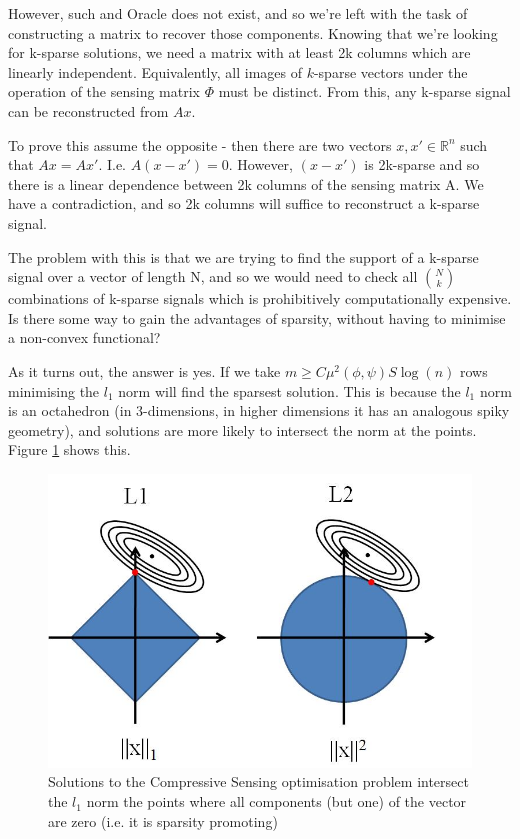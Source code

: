 However, such and Oracle does not exist, and so we're left with the task of constructing a matrix to recover those components. Knowing that we're looking for k-sparse solutions, we need a matrix with at least 2k columns which are linearly independent. Equivalently, all images of \(k\)-sparse vectors under the operation of the sensing matrix \(\Phi\) must be distinct. From this, any k-sparse signal can be reconstructed from \(Ax\). 

To prove this assume the opposite - then there are two vectors \(x, x' \in \mathbb{R}^n\) such that \(Ax = Ax'\). I.e. \(A(x-x') = 0\). However, \((x-x')\) is 2k-sparse and so there is a linear dependence between 2k columns of the sensing matrix A. We have a contradiction, and so 2k columns will suffice to reconstruct a k-sparse signal. 

The problem with this is that we are trying to find the support of a k-sparse signal over a vector of length N, and so we would need to check all \(N \choose k\) combinations of k-sparse signals which is prohibitively computationally expensive. Is there some way to gain the advantages of sparsity, without having to minimise a non-convex functional?

As it turns out, the answer is yes. If we take \( m \geq C \mu^2(\phi, \psi) S \log\left(n\right) \) rows minimising the \(l_{1}\) norm will find the sparsest solution. This is because the \(l_1\) norm is an octahedron (in 3-dimensions, in higher dimensions it has an analogous spiky geometry), and solutions are more likely to intersect the norm at the points. Figure \ref{l1l2} shows this.

\begin{figure}[h]
\centering
\includegraphics[height = 7 cm]{l1l2.jpg}
\caption{Solutions to the Compressive Sensing optimisation problem intersect the \(l_1\) norm the points where all components (but one) of the vector are zero (i.e. it is sparsity promoting) \cite{Tibshirani1996}}
\label{l1l2}
\end{figure}

